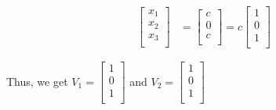 \documentclass{article}
\begin{document}
\begin{align*}
    \begin{bmatrix}
        x_1 \\
        x_2 \\
        x_3 \\
    \end{bmatrix}
    &= \begin{bmatrix}
        c \\
        0 \\
        c \\
    \end{bmatrix}
    = c\begin{bmatrix}
        1 \\
        0 \\
        1 \\
    \end{bmatrix}
\end{align*}

Thus, we get \( V_1 = 
\begin{bmatrix}
    1 \\
    0 \\
    1 \\
\end{bmatrix} \)
and \( V_2 = \begin{bmatrix}
    1 \\ 
    0 \\ 
    1 \\
\end{bmatrix} \)
\end{document}
